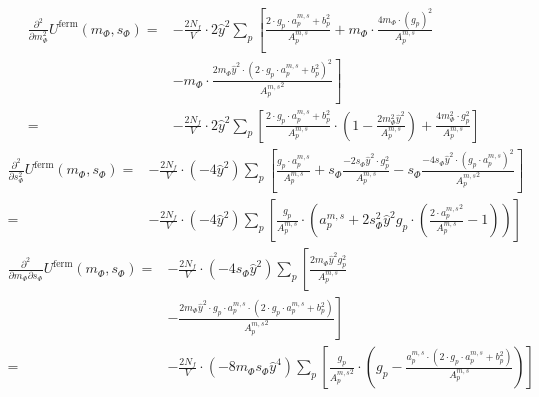 \begin{align}\label{eq:CEP_derivative_dmdm_fermionicContribution}        
 \frac{\partial^2 }{\partial m_{\Phi}^2} U^{\text{ferm}}(m_{\Phi}, s_{\Phi}) =& -\frac{2N_f}{V} \cdot 2 \hat y^2 \sum\limits_p
                   \left[ \frac{2 \cdot g_p \cdot {a_p^{m,s}} + b_p^2}{ {A_p^{m, s}} } 
                   + m_{\Phi} \cdot \frac{   4 m_{\Phi} \cdot  \left(g_p\right)^2    }{{A_p^{m, s}} } \right.
       \nonumber  \\
%                    
                  &- \left. m_{\Phi} \cdot \frac{ 2 m_{\Phi} \hat y^2 \cdot \left(2 \cdot g_p \cdot {a_p^{m,s}} + b_p^2 \right)^2 }
                    { {A_p^{m, s}}^2 } \right]
       \nonumber \\
%                     
             =& -\frac{2N_f}{V} \cdot 2 \hat y^2 \sum\limits_p 
                \left[ \frac{  2 \cdot g_p \cdot {a_p^{m,s}} + b_p^2   }{ {A_p^{m, s}} } 
                  \cdot \left( 1 - \frac{2m_{\Phi}^2 \hat y ^2}{ {A_p^{m, s}} }  \right) 
                  + \frac{   4 m_{\Phi}^2 \cdot g_p^2    }{{A_p^{m, s}} }\right]
\end{align} 
\begin{align} \label{eq:CEP_derivative_dsds_fermionicContribution}
 \frac{\partial^2 }{\partial s_{\Phi}^2} U^{\text{ferm}}(m_{\Phi}, s_{\Phi}) =& -\frac{2N_f}{V} \cdot (-4 \hat y^2) \sum\limits_p
                \left[ \frac{g_p \cdot {a_p^{m,s}} }{ {A_p^{m, s}} } 
                + s_{\Phi} \frac{ -2 s_{\Phi} \hat y^2 \cdot g_p^2}{ {A_p^{m, s}} }
                - s_{\Phi} \frac{ -4 s_{\Phi} \hat y^2 \cdot \left( g_p \cdot {a_p^{m,s}} \right)^2 }{ {A_p^{m, s}}^2 } \right]
      \nonumber \\
               =& -\frac{2N_f}{V} \cdot (-4 \hat y^2) \sum\limits_p 
                  \left[ \frac{g_p}{ {A_p^{m, s}} }\cdot \left( {a_p^{m,s}} + 2 s_{\Phi}^2 \hat y ^2 g_p 
                  \cdot \left( \frac{ 2 \cdot {a_p^{m,s}}^2}{  {A_p^{m, s}} } - 1 \right) \right) \right]
\end{align}
\begin{align} \label{eq:CEP_derivative_dmds_fermionicContribution}
 \frac{\partial^2 }{\partial m_{\Phi} \partial s_{\Phi}} U^{\text{ferm}}(m_{\Phi}, s_{\Phi}) =& -\frac{2N_f}{V} \cdot (-4 s_{\Phi}\hat y^2) \sum\limits_p
                   \left[ \frac{ 2 m_{\Phi} \hat y^2 g_p^2}{ {A_p^{m, s}} } \right. 
      \nonumber \\
                 & -\left. \frac{ 2 m_{\Phi} \hat y^2 \cdot g_p \cdot {a_p^{m,s}} \cdot \left( 2 \cdot g_p\cdot {a_p^{m,s}} + b_p^2 \right)}
                     { {A_p^{m, s}}^2 } \right] 
      \nonumber \\
                =& -\frac{2N_f}{V} \cdot (-8 m_{\Phi} s_{\Phi}\hat y^4) \sum\limits_p 
                    \left[ \frac{g_p}{ {A_p^{m, s}}^2 } \cdot \left( g_p  
                    - \frac{ {a_p^{m,s}} \cdot \left( 2 \cdot g_p\cdot {a_p^{m,s}} + b_p^2 \right)}
                     { {A_p^{m, s}} }\right) \right] 
\end{align}

